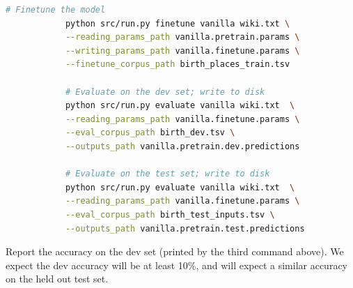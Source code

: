 \documentclass[letterpaper,12pt]{article}
\begin{document}
\begin{itemize}
\begin{lstlisting}[basicstyle=\ttfamily, language=bash]
			# Finetune the model
			python src/run.py finetune vanilla wiki.txt \
			--reading_params_path vanilla.pretrain.params \
			--writing_params_path vanilla.finetune.params \
			--finetune_corpus_path birth_places_train.tsv
			
			# Evaluate on the dev set; write to disk
			python src/run.py evaluate vanilla wiki.txt  \
			--reading_params_path vanilla.finetune.params \
			--eval_corpus_path birth_dev.tsv \
			--outputs_path vanilla.pretrain.dev.predictions
			
			# Evaluate on the test set; write to disk
			python src/run.py evaluate vanilla wiki.txt  \
			--reading_params_path vanilla.finetune.params \
			--eval_corpus_path birth_test_inputs.tsv \
			--outputs_path vanilla.pretrain.test.predictions
		\end{lstlisting}
		
		Report the accuracy on the dev set (printed by the third command above). We expect the dev accuracy will be at least 10\%, and will expect a similar accuracy on the held out test set.
		

\end{itemize}
\end{document}
